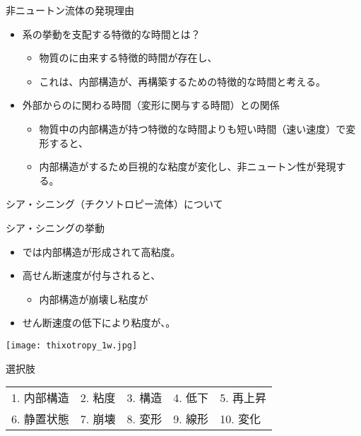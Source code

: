 \documentclass[uplatex,dvipdfmx,a4paper,11pt]{jsreport}
\begin{document}
\begin{qlist}
\begin{qlist2}
			\vspace{3mm}
			\qitem 非ニュートン流体の発現理由
			\begin{itemize}
				\item 系の挙動を支配する特徴的な時間とは？
				\begin{itemize}
					\item 物質の\qbox{}に由来する特徴的時間が存在し、
					\item これは、内部構造が\qbox{}、再構築するための特徴的な時間と考える。
				\end{itemize}
				\item 外部からの\qbox{}に関わる時間（変形に関与する時間）との関係
				\begin{itemize}
					\item 物質中の内部構造が持つ特徴的な時間よりも短い時間（速い速度）で変形すると、
					\item 内部構造が\qbox{}するため巨視的な粘度が変化し、非ニュートン性が発現する。
				\end{itemize}
			\end{itemize}
			
			\vspace{3mm}
			\qitem シア・シニング（チクソトロピー流体）について
			\begin{center}
				\begin{minipage}{0.5\textwidth}
					\begin{itembox}[l]{シア・シニングの挙動}
						\begin{itemize}
							\item \qbox{}では内部構造が形成されて高粘度。
							\item 高せん断速度が付与されると、
							\begin{itemize}
								\item 内部構造が崩壊し粘度が\qbox{}
							\end{itemize}
							\item せん断速度の低下により粘度が、\qbox{}。
						\end{itemize}
					\end{itembox}
				\end{minipage}
				\begin{minipage}{0.38\textwidth}
					\begin{center}
					\texttt{[image: thixotropy\_1w.jpg]}
					\end{center}
				\end{minipage}
			\end{center}

		\end{qlist2}

		\begin{itembox}[l]{選択肢}
			\begin{center}
				\begin{tabular}{lllll}
					1. 内部構造	&2. 粘度	&3. 構造	&4. 低下 &5. 再上昇\\
					6. 静置状態	&7. 崩壊	&8. 変形	&9. 線形 &10. 変化
				\end{tabular}
			\end{center}
		\end{itembox}
\end{qlist}
\end{document}
